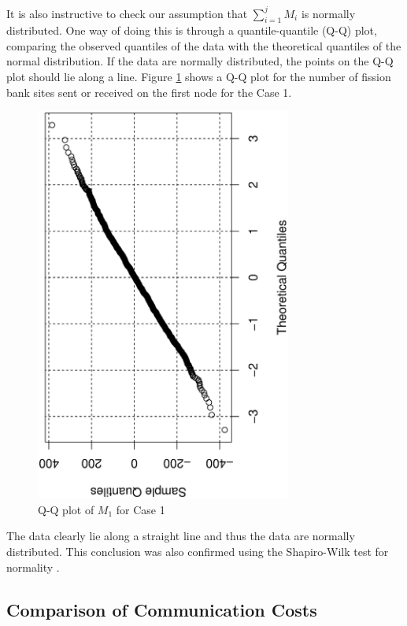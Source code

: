 It is also instructive to check our assumption that $\sum_{i=1}^j M_i$
is normally distributed. One way of doing this is through a
quantile-quantile (Q-Q) plot, comparing the observed quantiles of the
data with the theoretical quantiles of the normal distribution. If the
data are normally distributed, the points on the Q-Q plot should lie
along a line. Figure \ref{fig:QQ-plot} shows a Q-Q plot for the number
of fission bank sites sent or received on the first node for the Case
1.
\begin{figure}[ht]
  \centering
  \includegraphics[width=0.75\textwidth,angle=-90]{figures/QQ_plot/QQplot.eps}
  \caption{Q-Q plot of $M_1$ for Case 1}
  \label{fig:QQ-plot}
\end{figure}
The data clearly lie along a straight line and thus the data are
normally distributed. This conclusion was also confirmed using the
Shapiro-Wilk test for normality \cite{shapiro-wilk}.

\subsection{Comparison of Communication Costs}

